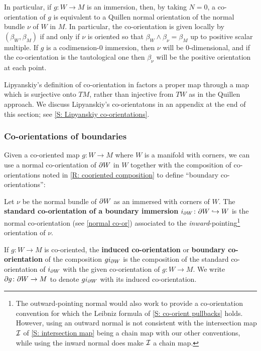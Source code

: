 \begin{remark}\label{R: immersion}
	In particular, if $g \colon W \to M$ is an immersion, then, by taking $N = 0$, a co-orientation of $g$ is equivalent to a Quillen normal orientation of the normal bundle $\nu$ of $W$ in $M$.
	In particular, the co-orientation is given locally by $(\beta_W, \beta_M)$ if and only if $\nu$ is oriented so that $\beta_W \wedge \beta_\nu = \beta_M$ up to positive scalar multiple.
	If $g$ is a codimension-$0$ immersion, then $\nu$ will be $0$-dimensional, and if the co-orientation is the tautological one then $\beta_\nu$ will be the positive orientation at each point.
\end{remark}


Lipyanskiy's definition of co-orientation in \cite{Lipy14} factors a proper map through a map which is surjective onto $TM$, rather than injective from $TW$ as in the Quillen approach.
We discuss Lipyanskiy's co-orientatons in an appendix at the end of this section; see \cref{S: Lipyanskiy co-orientations}.



\subsubsection{Co-orientations of boundaries}

Given a co-oriented map $g \colon W \to M$ where $W$ is a manifold with corners, we can use a normal co-orientation of $\partial W$ in $W$ together with the composition of co-orientations noted in \cref{R: cooriented composition} to define ``boundary co-orientations'':

\begin{definition}\label{D: boundary co-orientation}
	Let $\nu$ be the normal bundle of $\partial W$ as an immersed with corners of $W$.
	The \textbf{standard co-orientation of a boundary immersion} $i_{\partial W} \colon \partial W \hookrightarrow W$ is the normal co-orientation (see \cref{normal co-or}) associated to the \textit{inward}-pointing\footnote{The outward-pointing normal would also work to provide a co-orientation convention for which the Leibniz formula of \cref{S: co-orient pullbacks} holds.
	However, using an outward normal is not consistent with the intersection map $\mathcal{I}$ of \cref{S: intersection map} being a chain map with our other conventions, while using the inward normal does make $\mathcal{I}$ a chain map.} orientation of $\nu$.

	If $g \colon W \to M$ is co-oriented, the \textbf{induced co-orientation} or \textbf{boundary co-orientation} of the composition $gi_{\partial W}$ is the composition of the standard co-orientation of $i_{\partial W}$ with the given co-orientation of $g \colon W \to M$.
	We write $\partial g \colon \partial W \to M$ to denote $gi_{\partial W}$ with its induced co-orientation.
\end{definition}


